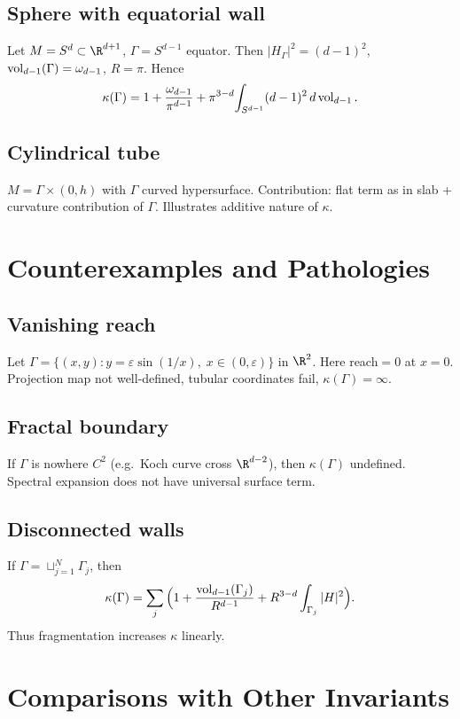 \subsection{Sphere with equatorial wall}
Let $M=S^d\subset\R^{d+1}$, $\Gamma=S^{d-1}$ equator.  
Then $|H_\Gamma|^2=(d-1)^2$, $\operatorname{vol}_{d-1}(\Gamma)=\omega_{d-1}$, $R=\pi$.  
Hence
\[
\kappa(\Gamma)=1+\frac{\omega_{d-1}}{\pi^{d-1}}+\pi^{3-d}\!\int_{S^{d-1}} (d-1)^2\,d\operatorname{vol}_{d-1}.
\]

\subsection{Cylindrical tube}
$M=\Gamma\times(0,h)$ with $\Gamma$ curved hypersurface.  
Contribution: flat term as in slab + curvature contribution of $\Gamma$.  
Illustrates additive nature of $\kappa$.

\section{Counterexamples and Pathologies}
\label{sec:counterexamples}

\subsection{Vanishing reach}
Let $\Gamma=\{(x,y):y=\varepsilon\sin(1/x),\; x\in(0,\varepsilon)\}$ in $\R^2$.  
Here reach$=0$ at $x=0$.  
Projection map not well-defined, tubular coordinates fail, $\kappa(\Gamma)=\infty$.

\subsection{Fractal boundary}
If $\Gamma$ is nowhere $C^2$ (e.g.\ Koch curve cross $\R^{d-2}$), then $\kappa(\Gamma)$ undefined.  
Spectral expansion does not have universal surface term.

\subsection{Disconnected walls}
If $\Gamma=\sqcup_{j=1}^N \Gamma_j$, then
\[
\kappa(\Gamma)=\sum_j \Big(1+\frac{\operatorname{vol}_{d-1}(\Gamma_j)}{R^{d-1}}+R^{3-d}\int_{\Gamma_j} |H|^2\Big).
\]
Thus fragmentation increases $\kappa$ linearly.

\section{Comparisons with Other Invariants}
\label{sec:comparisons}


